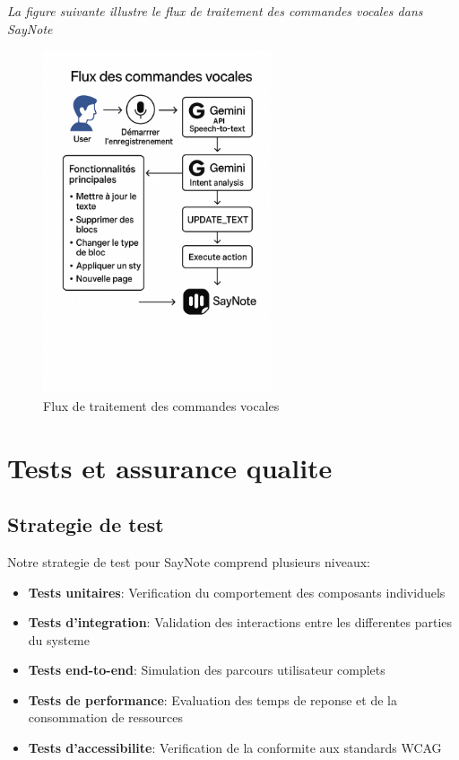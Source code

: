 \noindent
\textit{La figure suivante illustre le flux de traitement des commandes vocales dans SayNote}
\begin{figure}[H]
\centering
\includegraphics[width=0.6\textwidth]{assets/docs/golobal-diagrams/flux-des-commende-vocal.png}
\caption{Flux de traitement des commandes vocales}
\label{fig:voice-commands-flow}
\end{figure}


\section{Tests et assurance qualite}
\subsection{Strategie de test}
Notre strategie de test pour SayNote comprend plusieurs niveaux:
\begin{itemize}
    \item \textbf{Tests unitaires}: Verification du comportement des composants individuels
    \item \textbf{Tests d'integration}: Validation des interactions entre les differentes parties du systeme
    \item \textbf{Tests end-to-end}: Simulation des parcours utilisateur complets
    \item \textbf{Tests de performance}: Evaluation des temps de reponse et de la consommation de ressources
    \item \textbf{Tests d'accessibilite}: Verification de la conformite aux standards WCAG
\end{itemize}

